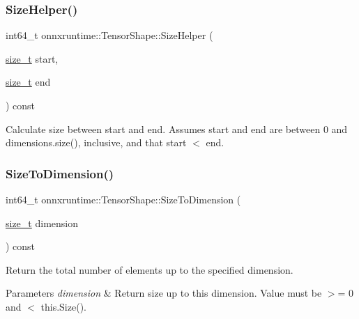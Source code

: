 \subsubsection{\texorpdfstring{Size\+Helper()}{SizeHelper()}}
{\footnotesize\ttfamily int64\+\_\+t onnxruntime\+::\+Tensor\+Shape\+::\+Size\+Helper (\begin{DoxyParamCaption}\item[{\mbox{\hyperlink{mlasi_8h_a503efbc1c6e50825320ad909366b78ab}{size\+\_\+t}}}]{start,  }\item[{\mbox{\hyperlink{mlasi_8h_a503efbc1c6e50825320ad909366b78ab}{size\+\_\+t}}}]{end }\end{DoxyParamCaption}) const}

Calculate size between start and end. Assumes start and end are between 0 and dimensions.\+size(), inclusive, and that start $<$ end. \mbox{\label{classonnxruntime_1_1TensorShape_af322918934d44918346fe19526f52897}} 
\subsubsection{\texorpdfstring{Size\+To\+Dimension()}{SizeToDimension()}}
{\footnotesize\ttfamily int64\+\_\+t onnxruntime\+::\+Tensor\+Shape\+::\+Size\+To\+Dimension (\begin{DoxyParamCaption}\item[{\mbox{\hyperlink{mlasi_8h_a503efbc1c6e50825320ad909366b78ab}{size\+\_\+t}}}]{dimension }\end{DoxyParamCaption}) const}

Return the total number of elements up to the specified dimension. 
\begin{DoxyParams}{Parameters}
{\em dimension} & Return size up to this dimension. Value must be $>$= 0 and $<$ this.\+Size(). \\
\hline
\end{DoxyParams}
\mbox{\label{classonnxruntime_1_1TensorShape_a996be17420fdb94cd5de15301a50d9be}} 
